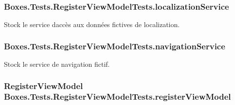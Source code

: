 \subsubsection[{\texorpdfstring{localization\+Service}{localizationService}}]{ Boxes.\+Tests.\+Register\+View\+Model\+Tests.\+localization\+Service\hspace{0.3cm}{\ttfamily [private]}}\hypertarget{class_boxes_1_1_tests_1_1_register_view_model_tests_a0dcb3e380c02a5620a2f80a082331694}{}\label{class_boxes_1_1_tests_1_1_register_view_model_tests_a0dcb3e380c02a5620a2f80a082331694}


Stock le service d\textquotesingle{}accès aux données fictives de localization. 

\subsubsection[{\texorpdfstring{navigation\+Service}{navigationService}}]{ Boxes.\+Tests.\+Register\+View\+Model\+Tests.\+navigation\+Service\hspace{0.3cm}{\ttfamily [private]}}\hypertarget{class_boxes_1_1_tests_1_1_register_view_model_tests_a2a1940ef43106495a7855ee63eda1583}{}\label{class_boxes_1_1_tests_1_1_register_view_model_tests_a2a1940ef43106495a7855ee63eda1583}


Stock le service de navigation fictif. 

\subsubsection[{\texorpdfstring{register\+View\+Model}{registerViewModel}}]{\setlength{\rightskip}{0pt plus 5cm}Register\+View\+Model Boxes.\+Tests.\+Register\+View\+Model\+Tests.\+register\+View\+Model\hspace{0.3cm}{\ttfamily [private]}}\hypertarget{class_boxes_1_1_tests_1_1_register_view_model_tests_a355429c3d088c1561b422af6cd0d7c98}{}\label{class_boxes_1_1_tests_1_1_register_view_model_tests_a355429c3d088c1561b422af6cd0d7c98}



